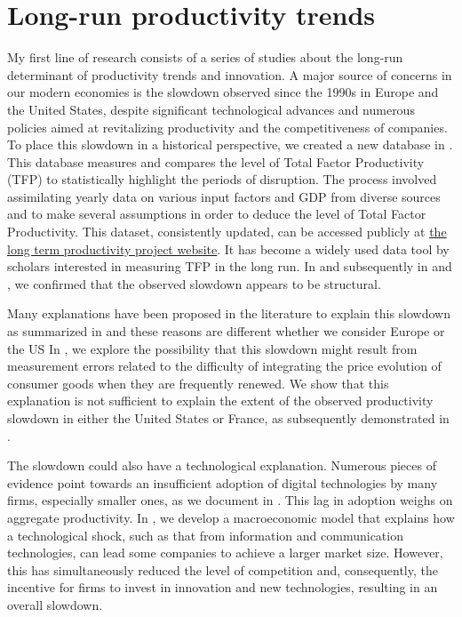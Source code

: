 \documentclass[12pt]{article}
\begin{document}
\section*{Long-run productivity trends}

My first line of research consists of a series of studies about the long-run determinant of productivity trends and innovation. A major source of concerns in our modern economies is the slowdown observed since the 1990s in Europe and the United States, despite significant technological advances and numerous policies aimed at revitalizing productivity and the competitiveness of companies. To place this slowdown in a historical perspective, we created a new database in \citet{bergeaud2016productivity}. This database
measures and compares the level of Total Factor Productivity (TFP) to statistically highlight the periods of disruption. The process involved assimilating yearly data on various input factors and GDP from diverse sources and to make several assumptions in order to deduce the level of Total Factor Productivity. This dataset, consistently updated, can be accessed publicly at \href{http://longtermproductivity.com}{the long term productivity project website}. It has become a widely used data tool by scholars interested in measuring TFP in the long run. In \citet*{bergeaud2016productivity} and subsequently in \citet*{bergeaud2017total} and \citet*{bergeaud2018role}, we confirmed that the observed slowdown appears to be structural.

Many explanations have been proposed in the literature to explain this slowdown as summarized in \citet{bergeaud2019market} and these reasons are different whether we consider Europe or the US \citep{bergeaud2024past} In \citet*{aghion2019missing}, we explore the possibility that this slowdown might result from measurement errors related to the difficulty of integrating the price evolution of consumer goods when they are frequently renewed. We show that this explanation is not sufficient to explain the extent of the observed productivity slowdown in either the United States or France, as subsequently demonstrated in \citet*{aghion2018firm}. 

The slowdown could also have a technological explanation. Numerous pieces of evidence point towards an insufficient adoption of digital technologies by many firms, especially smaller ones, as we document in \citet*{ecb}. This lag in adoption weighs on aggregate productivity. In \citet*{aghion2019theory}, we develop a macroeconomic model that explains how a technological shock, such as that from information and communication technologies, can lead some companies to achieve a larger market size. However, this has simultaneously reduced the level of competition and, consequently, the incentive for firms to invest in innovation and new technologies, resulting in an overall slowdown.
\end{document}
